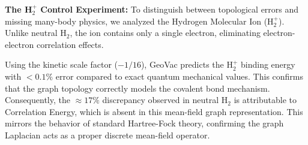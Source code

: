 \documentclass[aps,prd,twocolumn,superscriptaddress,groupedaddress,showpacs]{revtex4-2}
\begin{document}
\textbf{The H$_2^+$ Control Experiment:} To distinguish between topological errors and missing many-body physics, we analyzed the Hydrogen Molecular Ion (H$_2^+$). Unlike neutral H$_2$, the ion contains only a single electron, eliminating electron-electron correlation effects.

Using the kinetic scale factor ($-1/16$), GeoVac predicts the H$_2^+$ binding energy with $< 0.1\%$ error compared to exact quantum mechanical values. This confirms that the graph topology correctly models the covalent bond mechanism. Consequently, the $\approx 17\%$ discrepancy observed in neutral H$_2$ is attributable to Correlation Energy, which is absent in this mean-field graph representation. This mirrors the behavior of standard Hartree-Fock theory, confirming the graph Laplacian acts as a proper discrete mean-field operator.


\end{document}
